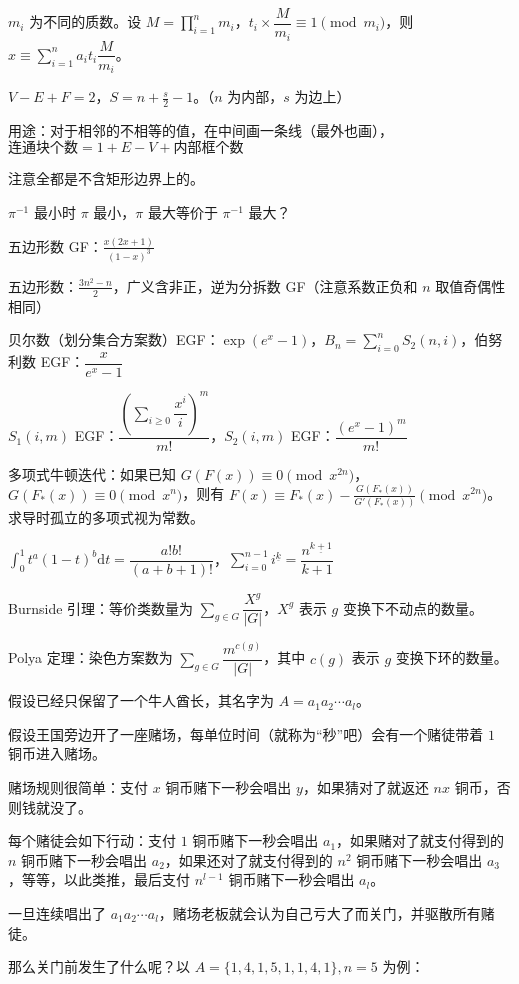 \documentclass[12pt]{ctexart}
\begin{document}
$m_i$ 为不同的质数。设 $M=\prod\limits_{i=1}^nm_i$，$t_i\times \dfrac {M}{m_i}\equiv 1\pmod {m_i}$，则 $x\equiv \sum\limits_{i=1}^na_it_i\dfrac {M}{m_i}$。

$V-E+F=2$，$S=n+\frac s2-1$。（$n$ 为内部，$s$ 为边上）

用途：对于相邻的不相等的值，在中间画一条线（最外也画），$\text{连通块个数}=1+E-V+\text{内部框个数}$

注意全都是不含矩形边界上的。

$\pi^{-1}$ 最小时 $\pi$ 最小，$\pi$ 最大等价于 $\pi^{-1}$ 最大？

五边形数 GF：$\frac{x(2x+1)}{(1-x)^3}$

五边形数：$\frac{3n^2-n}2$，广义含非正，逆为分拆数 GF（注意系数正负和 $n$ 取值奇偶性相同）

贝尔数（划分集合方案数）EGF：$\exp(e^x-1)$，$B_n=\sum\limits_{i=0}^n S_2(n,i)$，伯努利数 EGF：$\dfrac{x}{e^x-1}$

$S_1(i,m)$ EGF：$\dfrac{(\sum\limits_{i\ge 0}\dfrac{x^i}i)^m}{m!}$，$S_2(i,m)$ EGF：$\dfrac{(e^x-1)^m}{m!}$

多项式牛顿迭代：如果已知 $G(F(x))\equiv0\pmod{x^{2n}}$，$G(F_*(x))\equiv0\pmod {x^n}$，则有 $F(x)\equiv F_*(x)-\frac{G(F_*(x))}{G'(F_*(x))}\pmod{x^{2n}}$。求导时孤立的多项式视为常数。

$\int_0^1 t^a(1-t)^b\mathrm{d}t=\dfrac{a!b!}{(a+b+1)!}$，$\sum\limits_{i=0}^{n-1}i^{\underline{k}}=\dfrac{n^{\underline{k+1}}}{k+1}$

Burnside 引理：等价类数量为 $\sum\limits_{g\in G}\dfrac{X^g}{|G|}$，$X^g$ 表示 $g$ 变换下不动点的数量。

Polya 定理：染色方案数为 $\sum\limits_{g\in G}\dfrac{m^{c(g)}}{|G|}$，其中 $c(g)$ 表示 $g$ 变换下环的数量。

假设已经只保留了一个牛人酋长，其名字为 $A=a_1a_2\cdots a_l$。

假设王国旁边开了一座赌场，每单位时间（就称为“秒”吧）会有一个赌徒带着 $1$ 铜币进入赌场。

赌场规则很简单：支付 $x$ 铜币赌下一秒会唱出 $y$，如果猜对了就返还 $nx$ 铜币，否则钱就没了。

每个赌徒会如下行动：支付 $1$ 铜币赌下一秒会唱出 $a_1$，如果赌对了就支付得到的 $n$ 铜币赌下一秒会唱出 $a_2$，如果还对了就支付得到的 $n^2$ 铜币赌下一秒会唱出 $a_3$，等等，以此类推，最后支付 $n^{l-1}$ 铜币赌下一秒会唱出 $a_l$。

一旦连续唱出了 $a_1a_2\cdots a_l$，赌场老板就会认为自己亏大了而关门，并驱散所有赌徒。

那么关门前发生了什么呢？以 $A=\{1,4,1,5,1,1,4,1\},n=5$ 为例：
\end{document}
